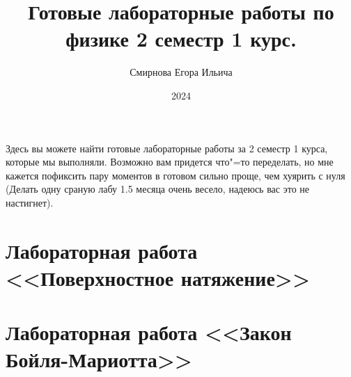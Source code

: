 \documentclass[bachelor, och, referat]{SCWorks}
\begin{document}

\title{Готовые лабораторные работы по физике 2 семестр 1 курс.}






\author{Смирнова Егора Ильича}

\date{2024}

\maketitle


\tableofcontents





\intro

Здесь вы можете найти готовые лабораторные работы за 2 семестр 1 курса, которые мы выполняли. Возможно вам придется что"=то переделать, но мне кажется пофиксить пару моментов в готовом сильно проще, чем хуярить с нуля (Делать одну сраную лабу 1.5 месяца очень весело, надеюсь вас это не настигнет).

\section{Лабораторная работа <<Поверхностное натяжение>>}



\section{Лабораторная работа <<Закон Бойля-Мариотта>>}


\end{document}
